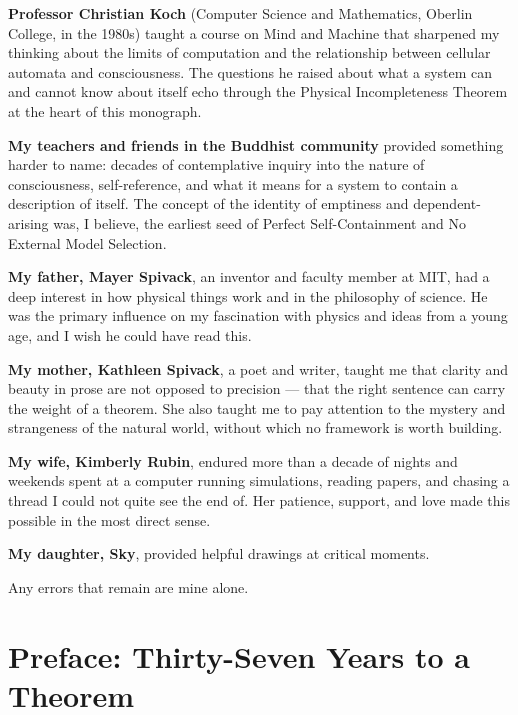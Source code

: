 \documentclass[11pt,openany]{book}
\theoremstyle{remark}
\begin{document}
\textbf{Professor Christian Koch} (Computer Science and Mathematics, Oberlin College, in the 1980s) taught a
course on Mind and Machine that sharpened my thinking about the limits of computation and the
relationship between cellular automata and consciousness.
The questions he raised about what a system can and cannot know about itself echo
through the Physical Incompleteness Theorem at the heart of this monograph.

\textbf{My teachers and friends in the Buddhist community} provided something harder to
name: decades of contemplative inquiry into the nature of consciousness, self-reference, and
what it means for a system to contain a description of itself.
The concept of the identity of emptiness and dependent-arising was, I believe, the earliest
seed of Perfect Self-Containment and No External Model Selection.

\textbf{My father, Mayer Spivack}, an inventor and faculty member at MIT, had a deep
interest in how physical things work and in the philosophy of science.
He was the primary influence on my fascination with physics and ideas from a young age,
and I wish he could have read this.

\textbf{My mother, Kathleen Spivack}, a poet and writer, taught me that clarity and beauty
in prose are not opposed to precision --- that the right sentence can carry the weight of
a theorem.
She also taught me to pay attention to the mystery and strangeness of the natural world,
without which no framework is worth building.

\textbf{My wife, Kimberly Rubin}, endured more than a decade of nights and weekends spent
at a computer running simulations, reading papers, and chasing a thread I could not quite
see the end of.
Her patience, support, and love made this possible in the most direct sense.

\textbf{My daughter, Sky}, provided helpful drawings at critical moments.

\bigskip

Any errors that remain are mine alone.

\chapter*{Preface: Thirty-Seven Years to a Theorem}
\label{chap:preface}
\end{document}
